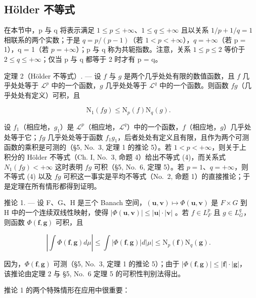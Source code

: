 \subsection{Hölder 不等式}

在本节中，p 与 q 将表示满足 \(1 \leqslant p \leqslant +\infty\)、\(1 \leqslant q \leqslant +\infty\) 且以关系 \(1/p + 1/q = 1\) 相联系的两个实数；于是 \(q = p/(p - 1)\)（若 \(1 < p < +\infty\)），\(q = +\infty\)（若 p = 1），q = 1（若 \(p = +\infty\)）；p 与 q 称为共轭指数。注意，关系 \(1 \leqslant p \leqslant 2\) 等价于 \(2 \leqslant q \leqslant +\infty\)；仅当 p 与 q 都等于 2 时才有 p = q。

定理 2（Hölder 不等式）. --- 设 \(f\) 与 \(g\) 是两个几乎处处有限的数值函数，且 \(f\) 几乎处处等于 \(\mathcal{L}^p\) 中的一个函数，\(g\) 几乎处处等于 \(\mathcal{L}^q\) 中的一个函数。则函数 \(fg\)（几乎处处有定义）可积，且

\[
\mathrm{N} _ {1} (f g) \leqslant \mathrm{N} _ {p} (f) \mathrm{N} _ {q} (g).\tag{4}
\]

设 \(f_{1}\)（相应地，\(g_{1}\)）是 \(\mathcal{L}^{p}\)（相应地，\(\mathcal{L}^{q}\)）中的一个函数，\(f\)（相应地，\(g\)）几乎处处等于它；\(fg\) 几乎处处等于函数 \(f_{1}g_{1}\)，后者处处有定义且有限，且作为两个可测函数的乘积是可测的（§5, No.~3, 定理 1 的推论 5）。若 \(1 < p < +\infty\)，则关于上积分的 Hölder 不等式（Ch. I, No.~3, 命题 4）给出不等式 (4)，而关系式 \(N_{1}(fg) < +\infty\) 这时表明 \(fg\) 可积（§5, No.~6, 定理 5）。若 \(p = 1\)、\(q = +\infty\)，则不等式 (4) 以及 \(fg\) 可积这一事实是平均不等式（No.~2, 命题 1）的直接推论；于是定理在所有情形都得到证明。

推论 1. --- 设 F、G、H 是三个 Banach 空间，\((\mathbf{u}, \mathbf{v}) \mapsto \Phi(\mathbf{u}, \mathbf{v})\) 是 \(F \times G\) 到 H 中的一个连续双线性映射，使得 \(|\Phi(\mathbf{u}, \mathbf{v})| \leqslant |\mathbf{u}| \cdot |\mathbf{v}|\) 。若 \(f \in L_{F}^{p}\) 且 \(g \in L_{G}^{q}\)，则函数 \(\Phi(\mathbf{f}, \mathbf{g})\) 可积，且

\[
\left| \int \Phi (\mathbf {f}, \mathbf {g}) d \mu \right| \leqslant \int | \Phi (\mathbf {f}, \mathbf {g}) | d | \mu | \leqslant \mathrm{N} _ {p} (\mathbf {f}) \mathrm{N} _ {q} (\mathbf {g}).\tag{5}
\]

因为，\(\Phi(\mathbf{f},\mathbf{g})\) 可测（§5, No.~3, 定理 1 的推论 5）；由于 \(|\Phi(\mathbf{f},\mathbf{g})| \leqslant |\mathbf{f}| \cdot |\mathbf{g}|\)，该推论由定理 2 与 §5, No.~6 定理 5 的可积性判别法得出。

推论 1 的两个特殊情形在应用中很重要：

